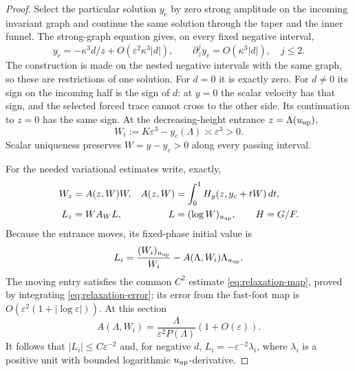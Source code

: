\begin{proof}
Select the particular solution $y_c$ by zero strong amplitude on the
incoming invariant graph and continue the same solution through the
taper and the inner funnel. The strong-graph equation gives, on every
fixed negative interval,
\[
 y_c=-\kappa^3d/z+O(\varepsilon^2\kappa^3|d|),
 \qquad \partial_z^jy_c=O(\kappa^3|d|),\quad j\le2.
\]
The construction is made on the nested negative intervals with the
same graph, so these are restrictions of one solution. For $d=0$ it
is exactly zero. For $d\ne0$ its sign on the incoming half is the
sign of $d$: at $y=0$ the scalar velocity has that sign, and the
selected forced trace cannot cross to the other side. Its continuation
to $z=0$ has the same sign. At the decreasing-height entrance
$z=\Lambda(u_{\rm up})$,
\[
 W_i:=K\varepsilon^3-y_c(\Lambda)\asymp\varepsilon^3>0.
\]
Scalar uniqueness preserves $W=y-y_c>0$ along every passing interval.

For the needed variational estimates write, exactly,
\begin{equation}
\label{eq:pc-tail-feedback}
 \begin{aligned}
 W_z&=A(z,W)W,&
 A(z,W)&=\int_0^1H_y(z,y_c+tW)\,dt,\\
 L_z&=WA_WL,& L&=(\log W)_{u_{\rm up}},\qquad H=G/F.
 \end{aligned}
\end{equation}
Because the entrance moves, its fixed-phase initial value is
\begin{equation}
\label{eq:pc-moving-entry}
 L_i=\frac{(W_i)_{u_{\rm up}}}{W_i}
       -A(\Lambda,W_i)\Lambda_{u_{\rm up}}.
\end{equation}
The moving entry satisfies the common $C^2$ estimate
\eqref{eq:relaxation-map}, proved by integrating
\eqref{eq:relaxation-error}; its error from the fast-foot map is
$O(\varepsilon^2(1+|\log\varepsilon|))$.
At this section
\[
 A(\Lambda,W_i)
 =\frac{\Lambda}{\varepsilon^2P(\Lambda)}(1+O(\varepsilon)).
\]
It follows that $|L_i|\le C\varepsilon^{-2}$ and, for negative $d$,
$L_i=-\varepsilon^{-2}\lambda_i$, where $\lambda_i$ is a positive
unit with bounded logarithmic $u_{\rm up}$-derivative.


\end{proof}
